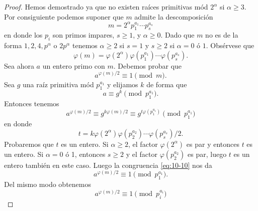 \documentclass[12pt,a4paper]{book}
\begin{document}
    \begin{proof}
        Hemos demostrado ya que no existen raíces primitivas mód $2^{\alpha}$ si
        $\alpha\geq3$. Por consiguiente podemos suponer que $m$ admite la descomposición
        \begin{equation*}
            m=2^{\alpha}p_{1}^{a_{1}}\cdots p_{s}^{a_{s}}
        \end{equation*}
        en donde los $p_{i}$ son primos impares, $s\geq1$, y $\alpha\geq0$. Dado que $m$ no es
        de la forma $1,2,4,p^{\alpha}$ o $2p^{\alpha}$ tenemos $\alpha\geq2$ si $s=1$ y
        $s\geq2$ si $\alpha=0$ ó $1$. Obsérvese que
        \begin{equation*}
            \varphi(m)=\varphi(2^{\alpha})\varphi(p_{1}^{a_{1}})\cdots\varphi(p_{s}^{a_{s}}).
        \end{equation*}
        Sea ahora $a$ un entero primo con $m$. Debemos probar que
        \begin{equation*}
            a^{\varphi(m)/2}\equiv1\pmod{m}.
        \end{equation*}
        Sea $g$ una raíz primitiva mód $p_{1}^{a_{1}}$ y elijamos $k$ de forma que
        \begin{equation*}
            a\equiv g^{k}\pmod{p_{1}^{a_{1}}}.
        \end{equation*}
        Entonces tenemos
        \begin{equation}\label{eq:10-10}
            a^{\varphi(m)/2}\equiv g^{k\varphi(m)/2}\equiv g^{t\varphi(p_{1}^{a_{1}})}\pmod{p_{1}^{a_{1}}}
        \end{equation}
        en donde
        \begin{equation*}
            t=k\varphi(2^{\alpha})\varphi(p_{2}^{a_{2}})\cdots\varphi(p_{s}^{a_{s}})/2.
        \end{equation*}
        Probaremos que $t$ es un entero. Si $\alpha\geq2$, el factor $\varphi(2^{\alpha})$ es
        par y entonces $t$ es un entero. Si $\alpha=0$ ó 1, entonces $s\geq2$ y el factor
        $\varphi(p_{2}^{a_{2}})$ es par, luego $t$ es un entero también en este caso. Luego la
        congruencia \eqref{eq:10-10} nos da
        \begin{equation*}
            a^{\varphi(m)/2}\equiv1\pmod{p_{1}^{a_{1}}}.
        \end{equation*}
        Del mismo modo obtenemos
        \begin{equation}\label{eq:10-11}
            a^{\varphi(m)/2}\equiv1\pmod{p_{i}^{a_{i}}}

\end{equation}
\end{proof}
\end{document}
